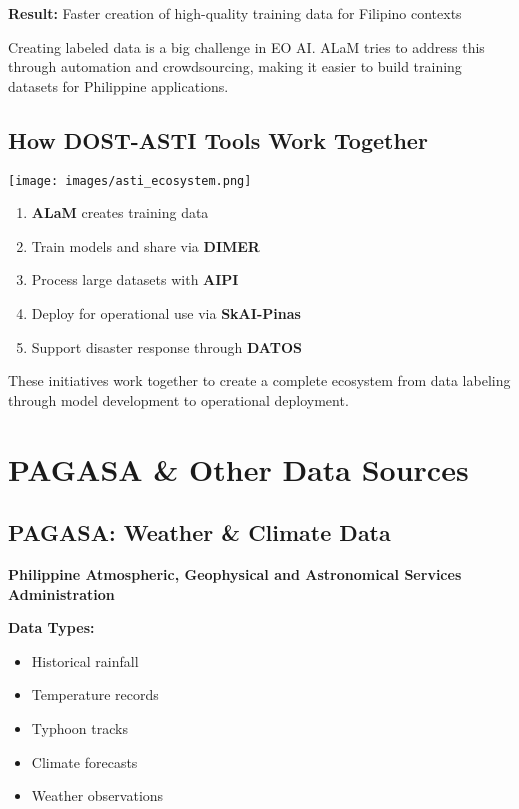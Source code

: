 \documentclass[
  letterpaper,
  DIV=11,
  numbers=noendperiod]{scrartcl}
\providecommand{\tightlist}{%
  \setlength{\itemsep}{0pt}\setlength{\parskip}{0pt}}
\begin{document}
\textbf{Result:} Faster creation of high-quality training data for
Filipino contexts

Creating labeled data is a big challenge in EO AI. ALaM tries to address
this through automation and crowdsourcing, making it easier to build
training datasets for Philippine applications.

\subsection{How DOST-ASTI Tools Work
Together}\label{how-dost-asti-tools-work-together}

\begin{center}
\texttt{[image: images/asti\_ecosystem.png]}
\end{center}

\begin{enumerate}
\def\labelenumi{\arabic{enumi}.}
\tightlist
\item
  \textbf{ALaM} creates training data
\item
  Train models and share via \textbf{DIMER}
\item
  Process large datasets with \textbf{AIPI}
\item
  Deploy for operational use via \textbf{SkAI-Pinas}
\item
  Support disaster response through \textbf{DATOS}
\end{enumerate}

These initiatives work together to create a complete ecosystem from data
labeling through model development to operational deployment.

\section{PAGASA \& Other Data Sources}\label{pagasa-other-data-sources}

\subsection{PAGASA: Weather \& Climate
Data}\label{pagasa-weather-climate-data}

\textbf{Philippine Atmospheric, Geophysical and Astronomical Services
Administration}

\textbf{Data Types:}

\begin{itemize}
\tightlist
\item
  Historical rainfall
\item
  Temperature records
\item
  Typhoon tracks
\item
  Climate forecasts
\item
  Weather observations
\end{itemize}
\end{document}
